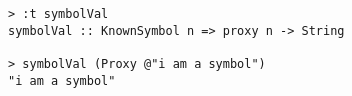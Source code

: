 \begin{repl}\begin{lstlisting}
> :t symbolVal
symbolVal :: KnownSymbol n => proxy n -> String

> symbolVal (Proxy @"i am a symbol")
"i am a symbol"\end{lstlisting}\end{repl}
